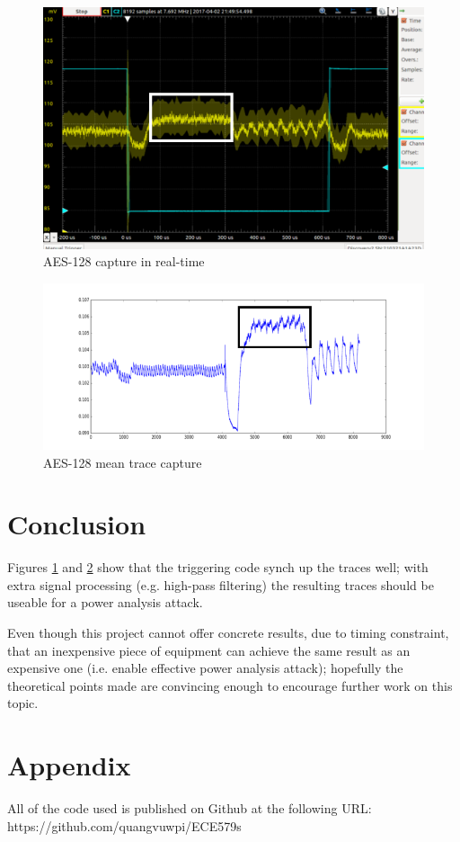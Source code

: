 \documentclass[conference]{IEEEtran}
\begin{document}
\begin{figure}
  \includegraphics[scale=0.45]{aes_annotate.png}
  \caption{AES-128 capture in real-time}
  \label{fig:aes}
\end{figure}

\begin{figure}
  \includegraphics[scale=0.45]{aes_acquisition_annotate.png}
  \caption{AES-128 mean trace capture}
  \label{fig:aes_avg}
\end{figure}

\section{Conclusion}
Figures \ref{fig:aes} and \ref{fig:aes_avg} show that the triggering code synch up the traces well; with extra signal processing (e.g. high-pass filtering) the resulting traces should be useable for a power analysis attack.

Even though this project cannot offer concrete results, due to timing constraint, that an inexpensive piece of equipment can achieve the same result as an expensive one (i.e. enable effective power analysis attack); hopefully the theoretical points made are convincing enough to encourage further work on this topic.

\section{Appendix}
All of the code used is published on Github at the following URL: https://github.com/quangvuwpi/ECE579s

%


\end{document}
